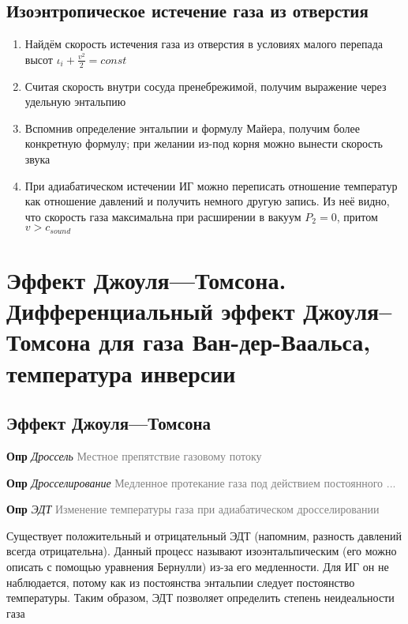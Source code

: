 \documentclass[a4paper, 14pt]{article}
\begin{document}
    \subsection{Изоэнтропическое истечение газа из отверстия}

    \begin{enumerate}
        \item Найдём скорость истечения газа из отверстия в условиях малого перепада высот $\iota_i + \frac{v^2}{2} = const$
        \item Считая скорость внутри сосуда пренебрежимой, получим выражение через удельную энтальпию
        \item Вспомнив определение энтальпии и формулу Майера, получим более конкретную формулу; при желании из-под
        корня можно вынести скорость звука
        \item При адиабатическом истечении ИГ можно переписать отношение температур как отношение давлений и получить
        немного другую запись.
        Из неё видно, что скорость газа максимальна при расширении в вакуум $P_2 = 0$, притом $v > c_{sound}$
    \end{enumerate}

    \section{Эффект Джоуля—Томсона.
    Дифференциальный эффект Джоуля–Томсона для газа Ван-дер-Ваальса, температура инверсии}

    \subsection{Эффект Джоуля—Томсона}

    \textbf{Опр} \textit{Дроссель} \textcolor{gray}{Местное препятствие газовому потоку}

    \textbf{Опр} \textit{Дросселирование} \textcolor{gray}{Медленное протекание газа под действием постоянного ...}

    \textbf{Опр} \textit{ЭДТ} \textcolor{gray}{Изменение температуры газа при адиабатическом дросселировании}

    Существует положительный и отрицательный ЭДТ (напомним, разность давлений всегда отрицательна).
    Данный процесс называют изоэнтальпическим (его можно описать с помощью уравнения Бернулли) из-за его медленности.
    Для ИГ он не наблюдается, потому как из постоянства энтальпии следует постоянство температуры.
    Таким образом, ЭДТ позволяет определить степень неидеальности газа
\end{document}
